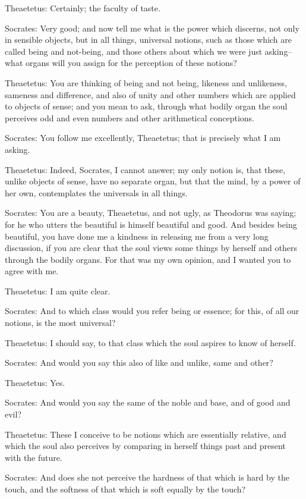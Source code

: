 Theaetetus: Certainly; the faculty of taste.

Socrates: Very good; and now tell me what is the power which discerns,
not only in sensible objects, but in all things, universal notions, such
as those which are called being and not-being, and those others
about which we were just asking--what organs will you assign for the
perception of these notions?

Theaetetus: You are thinking of being and not being, likeness and
unlikeness, sameness and difference, and also of unity and other numbers
which are applied to objects of sense; and you mean to ask, through
what bodily organ the soul perceives odd and even numbers and other
arithmetical conceptions.

Socrates: You follow me excellently, Theaetetus; that is precisely what
I am asking.

Theaetetus: Indeed, Socrates, I cannot answer; my only notion is, that
these, unlike objects of sense, have no separate organ, but that the
mind, by a power of her own, contemplates the universals in all things.

Socrates: You are a beauty, Theaetetus, and not ugly, as Theodorus was
saying; for he who utters the beautiful is himself beautiful and good.
And besides being beautiful, you have done me a kindness in releasing me
from a very long discussion, if you are clear that the soul views some
things by herself and others through the bodily organs. For that was my
own opinion, and I wanted you to agree with me.

Theaetetus: I am quite clear.

Socrates: And to which class would you refer being or essence; for this,
of all our notions, is the most universal?

Theaetetus: I should say, to that class which the soul aspires to know
of herself.

Socrates: And would you say this also of like and unlike, same and
other?

Theaetetus: Yes.

Socrates: And would you say the same of the noble and base, and of good
and evil?

Theaetetus: These I conceive to be notions which are essentially
relative, and which the soul also perceives by comparing in herself
things past and present with the future.

Socrates: And does she not perceive the hardness of that which is hard
by the touch, and the softness of that which is soft equally by the
touch?

